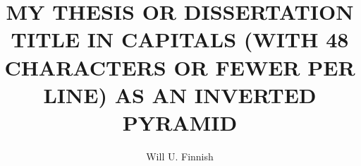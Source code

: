\documentclass[12pt,econ]{sources/authesis}
\title{MY THESIS OR DISSERTATION TITLE IN CAPITALS (WITH 48 CHARACTERS OR FEWER
PER LINE) AS AN INVERTED PYRAMID}
\author{Will U. Finnish}
\theoremstyle{definition}
\theoremstyle{definition}
\theoremstyle{definition}
\theoremstyle{remark}
\begin{document}
%
%



\maketitle

\maketitle


\copyrightpage
\end{document}
